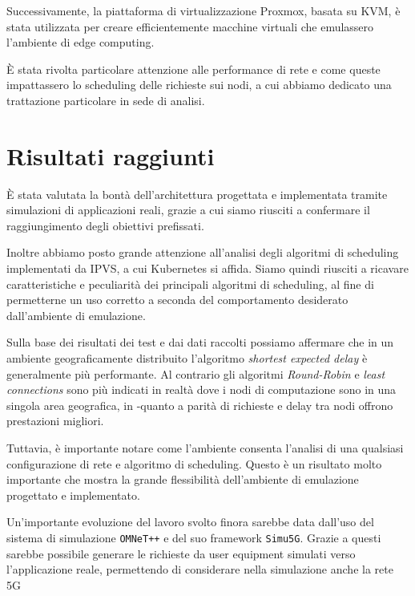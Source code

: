 \documentclass{article}
\begin{document}
Successivamente, la piattaforma di virtualizzazione Proxmox, basata su KVM, è stata utilizzata per creare efficientemente macchine virtuali che emulassero l'ambiente di edge computing.

È stata rivolta particolare attenzione alle performance di rete e come queste impattassero lo scheduling delle richieste sui nodi, a cui abbiamo dedicato una trattazione particolare in sede di analisi.

\section{Risultati raggiunti}

È stata valutata la bontà dell'architettura progettata e implementata tramite simulazioni di applicazioni reali, grazie a cui siamo riusciti a confermare il raggiungimento degli obiettivi prefissati.

Inoltre abbiamo posto grande attenzione all'analisi degli algoritmi di scheduling implementati da IPVS, a cui Kubernetes si affida. Siamo quindi riusciti a ricavare caratteristiche e peculiarità dei principali algoritmi di scheduling, al fine di permetterne un uso corretto a seconda del comportamento desiderato dall'ambiente di emulazione.

Sulla base dei risultati dei test e dai dati raccolti possiamo affermare che in un ambiente geograficamente distribuito l’algoritmo \textit{shortest expected delay} è generalmente più performante. Al contrario gli algoritmi \textit{Round-Robin} e \textit{least connections} sono più indicati in realtà dove i nodi di computazione sono in una singola area geografica, in -quanto a parità di richieste e delay tra nodi offrono prestazioni migliori.

Tuttavia, è importante notare come l’ambiente consenta l’analisi di una qualsiasi configurazione di rete e algoritmo di scheduling. Questo è un risultato molto importante che mostra la grande flessibilità dell’ambiente di emulazione progettato e implementato.

Un’importante evoluzione del lavoro svolto finora sarebbe data dall’uso del sistema di simulazione \texttt{OMNeT++} e del suo framework \texttt{Simu5G}. Grazie a questi sarebbe possibile generare le richieste da user equipment simulati verso l’applicazione reale, permettendo di considerare nella simulazione anche la rete 5G
\end{document}
